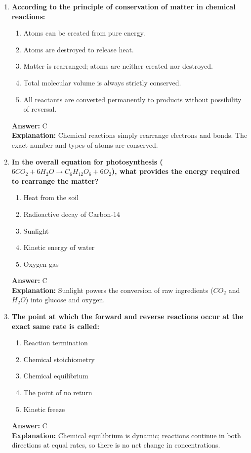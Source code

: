 \documentclass[11pt, a4paper]{article}
\begin{document}
\begin{enumerate}
\item \textbf{According to the principle of conservation of matter in chemical reactions:}
\begin{enumerate}[label=\Alph*.]
    \item Atoms can be created from pure energy.
    \item Atoms are destroyed to release heat.
    \item Matter is rearranged; atoms are neither created nor destroyed.
    \item Total molecular volume is always strictly conserved.
    \item All reactants are converted permanently to products without possibility of reversal.
\end{enumerate}
\textbf{Answer:} C \\
\textbf{Explanation:} Chemical reactions simply rearrange electrons and bonds. The exact number and types of atoms are conserved.

\item \textbf{In the overall equation for photosynthesis ($6CO_2 + 6H_2O \rightarrow C_6H_{12}O_6 + 6O_2$), what provides the energy required to rearrange the matter?}
\begin{enumerate}[label=\Alph*.]
    \item Heat from the soil
    \item Radioactive decay of Carbon-14
    \item Sunlight
    \item Kinetic energy of water
    \item Oxygen gas
\end{enumerate}
\textbf{Answer:} C \\
\textbf{Explanation:} Sunlight powers the conversion of raw ingredients ($CO_2$ and $H_2O$) into glucose and oxygen.

\item \textbf{The point at which the forward and reverse reactions occur at the exact same rate is called:}
\begin{enumerate}[label=\Alph*.]
    \item Reaction termination
    \item Chemical stoichiometry
    \item Chemical equilibrium
    \item The point of no return
    \item Kinetic freeze
\end{enumerate}
\textbf{Answer:} C \\
\textbf{Explanation:} Chemical equilibrium is dynamic; reactions continue in both directions at equal rates, so there is no net change in concentrations.


\end{enumerate}
\end{document}

